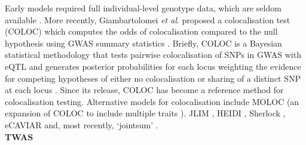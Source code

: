 Early models \cite{plagnol2009statistical, wallace2012statistical, nica2010candidate} required full individual-level genotype data, which are seldom available \cite{cano2020gwas}.
More recently, Giambartolomei \textit{et al}. proposed a  colocalisation test (COLOC) which computes the odds of colocalisation compared to the null hypothesis using GWAS summary statistics \cite{giambartolomei2014bayesian}. 
Briefly, COLOC is a Bayesian statistical methodology that tests pairwise colocalisation of SNPs in GWAS with eQTL and generates posterior probabilities for each locus weighting the evidence for competing hypotheses of either no colocalisation or sharing of a distinct SNP at each locus \cite{guo2015integration}.
Since its release, COLOC has become a reference method for colocalisation testing. 
Alternative models for colocalisation include 
MOLOC (an expansion of COLOC to include multiple traits \cite{giambartolomei2018bayesian}).
JLIM \cite{chun2017limited}, 
HEIDI \cite{zhu2016integration}, 
Sherlock \cite{he2013sherlock},
eCAVIAR \cite{hormozdiari2016colocalization} 
and, most recently, `jointsum' \cite{deng2020powerful}.\\




\textbf{TWAS}


